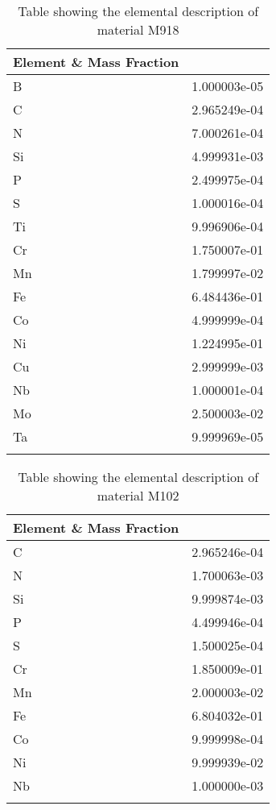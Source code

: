 \begin{centering}
\begin{longtable}[ht!]
\caption{Table showing the elemental description of material M937}
\label{table:material_UppWater}
\end{longtable}
\clearpage

\begin{longtable}[ht!]
{ p{} | p{} }
\hline
Element \& Mass Fraction\\
\hline
B &  1.000003e-05\\
C &  2.965249e-04\\
N &  7.000261e-04\\
Si &  4.999931e-03\\
P &  2.499975e-04\\
S &  1.000016e-04\\
Ti &  9.996906e-04\\
Cr &  1.750007e-01\\
Mn &  1.799997e-02\\
Fe &  6.484436e-01\\
Co &  4.999999e-04\\
Ni &  1.224995e-01\\
Cu &  2.999999e-03\\
Nb &  1.000001e-04\\
Mo &  2.500003e-02\\
Ta &  9.999969e-05\\

\caption{Table showing the elemental description of material M918}
\label{table:material_Lenses}
\end{longtable}
\clearpage

\begin{longtable}[ht!]
{ p{} | p{} }
\hline
Element \& Mass Fraction\\
\hline
C &  2.965246e-04\\
N &  1.700063e-03\\
Si &  9.999874e-03\\
P &  4.499946e-04\\
S &  1.500025e-04\\
Cr &  1.850009e-01\\
Mn &  2.000003e-02\\
Fe &  6.804032e-01\\
Co &  9.999998e-04\\
Ni &  9.999939e-02\\
Nb &  1.000000e-03\\

\caption{Table showing the elemental description of material M102}
\label{table:material_M102}
\end{longtable}
\clearpage


\end{centering}
